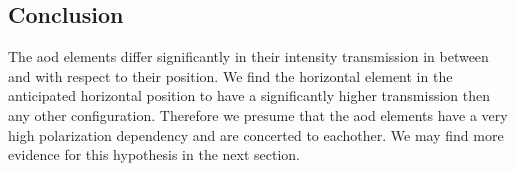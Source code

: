 \subsection{Conclusion}

The \gls{aod} elements differ significantly in their intensity transmission
in between and with respect to their position. We find the horizontal element
in the anticipated horizontal position to have a significantly higher
transmission then any other configuration. Therefore we presume that the
\gls{aod} elements have a very high polarization dependency and are concerted
to eachother. We may find more evidence for this hypothesis in the next
section.
